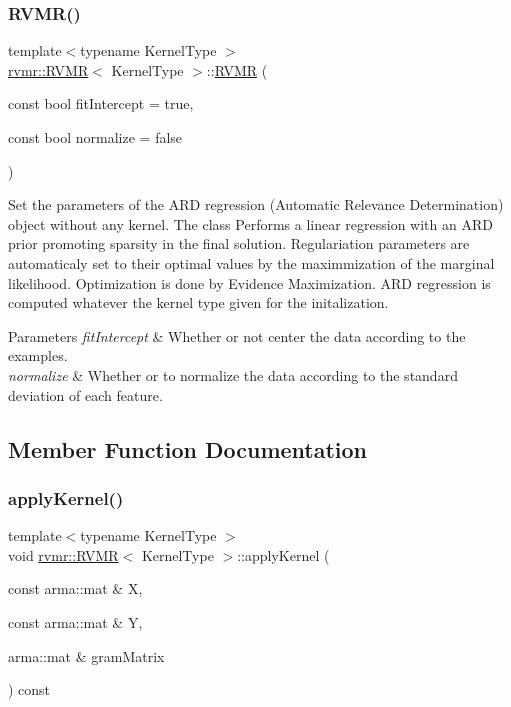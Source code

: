 \subsubsection{\texorpdfstring{R\+V\+M\+R()}{RVMR()}\hspace{0.1cm}{\footnotesize\ttfamily [2/2]}}
{\footnotesize\ttfamily template$<$typename Kernel\+Type $>$ \\
\hyperlink{classrvmr_1_1RVMR}{rvmr\+::\+R\+V\+MR}$<$ Kernel\+Type $>$\+::\hyperlink{classrvmr_1_1RVMR}{R\+V\+MR} (\begin{DoxyParamCaption}\item[{const bool}]{fit\+Intercept = {\ttfamily true},  }\item[{const bool}]{normalize = {\ttfamily false} }\end{DoxyParamCaption})}

Set the parameters of the A\+RD regression (Automatic Relevance Determination) object without any kernel. The class Performs a linear regression with an A\+RD prior promoting sparsity in the final solution. Regulariation parameters are automaticaly set to their optimal values by the maximmization of the marginal likelihood. Optimization is done by Evidence Maximization. A\+RD regression is computed whatever the kernel type given for the initalization.


\begin{DoxyParams}{Parameters}
{\em fit\+Intercept} & Whether or not center the data according to the examples. \\
\hline
{\em normalize} & Whether or to normalize the data according to the standard deviation of each feature. \\
\hline
\end{DoxyParams}


\subsection{Member Function Documentation}
\mbox{\label{classrvmr_1_1RVMR_a12461ea1a5ef6d6f5ef3c00f4904338a}} 
\subsubsection{\texorpdfstring{apply\+Kernel()}{applyKernel()}}
{\footnotesize\ttfamily template$<$typename Kernel\+Type $>$ \\
void \hyperlink{classrvmr_1_1RVMR}{rvmr\+::\+R\+V\+MR}$<$ Kernel\+Type $>$\+::apply\+Kernel (\begin{DoxyParamCaption}\item[{const arma\+::mat \&}]{X,  }\item[{const arma\+::mat \&}]{Y,  }\item[{arma\+::mat \&}]{gram\+Matrix }\end{DoxyParamCaption}) const}


